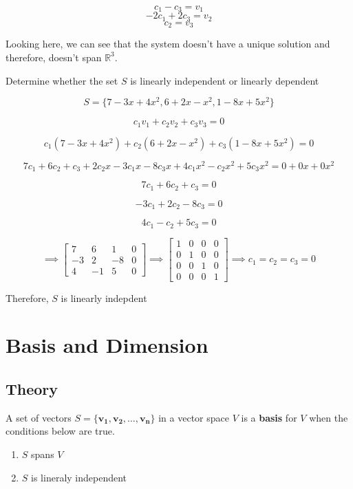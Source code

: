 \documentclass{report}
\begin{document}
$$c_1 - c_3 = v_1 $$
$$ -2c_1 + 2c_3 = v_2$$
$$c_2 = v_3$$

Looking here, we can see that the system doesn't have a unique solution and therefore, doesn't span $\mathbb{R}^3$.

\begin{tcolorbox}[colframe = lightred]
	Determine whether the set $S$ is linearly independent or linearly dependent
	
	$$
	S= \{7-3x+4x^2, 6+2x-x^2, 1-8x+5x^2\}
	$$
\end{tcolorbox}


$$
c_1 v_1 + c_2v_2 + c_3v_3 = 0
$$

$$
c_1 (7-3x+4x^2) + c_2 (6+2x-x^2) + c_3 (1-8x+5x^2) = 0
$$

$$
7c_1 + 6c_2 + c_3 + 2c_2 x - 3c_1 x - 8 c_3 x + 4c_1 x^2  - c_2 x^2 + 5c_3 x^2 = 0 + 0x + 0x^2
$$

$$
7c_1 + 6 c_2 + c_3 = 0
$$

$$
-3c_1 + 2c_2 - 8 c_3 = 0 
$$

$$
4c_1 - c_2 + 5c_3 = 0
$$

$$
\implies \begin{bmatrix} 7 & 6 & 1 & 0 \\ -3 & 2 & -8 & 0 \\ 4 & -1 & 5 & 0 \end{bmatrix}  \implies \begin{bmatrix} 	1 & 0 & 0 & 0 \\ 0 & 1 & 0 & 0 \\ 0 & 0 & 1 & 0 \\ 0 & 0 & 0 & 1 \end{bmatrix} \implies c_1 = c_2 = c_3 = 0
$$

Therefore, $S$ is linearly indepdent

\section{Basis and Dimension}

\subsection{Theory}

\begin{tcolorbox}[title  = Definition of a Basis]
	A set of vectors $S = \{\bm{v_1}, \bm{v_2}, \hdots, \bm{v_n}\}$ in a vector space $V$ is a \textbf{basis} for $V$ when the conditions below are true.
	
	\begin{enumerate}
		\item $S$ spans $V$
		\item $S$ is lineraly independent 
	\end{enumerate}
	
\end{tcolorbox}
\end{document}
